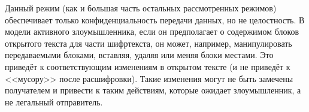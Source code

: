 Данный режим (как и большая часть остальных рассмотренных режимов) обеспечивает только конфиденциальность передачи данных, но не целостность. В модели активного злоумышленника, если он предполагает о содержимом блоков открытого текста для части шифртекста, он может, например, манипулировать передаваемыми блоками, вставляя, удаляя или меняя блоки местами. Это приведёт к соответствующим изменениям в открытом тексте (и не приведёт к <<мусору>> после расшифровки). Такие изменения могут не быть замечены получателем и привести к таким действиям, которые ожидает злоумышленник, а не легальный отправитель.
